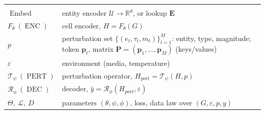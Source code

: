 \begin{table}[t]
\begin{tabular}{@{}l p{}@{}}
\addlinespace
\multicolumn{2}{@{}l}{\emph{Model}}\\
$\operatorname{Embed}$ & entity encoder $\mathcal{U}\to\mathbb{R}^{d}$, or lookup $\mathbf{E}$ \\
$F_\theta\ (\operatorname{ENC})$ & cell encoder, $H=F_\theta(G)$ \\
$p$ & perturbation set $\{(e_t,\tau_t,m_t)\}_{t=1}^{M}$: entity, type, magnitude; token $\mathbf{p}_t$, matrix $\mathbf{P}=(\mathbf{p}_1,\dots,\mathbf{p}_M)$ (keys/values) \\
$\varepsilon$ & environment (media, temperature) \\
$\mathcal{T}_\psi\ (\operatorname{PERT})$ & perturbation operator, $H_{\mathrm{pert}}=\mathcal{T}_\psi(H,p)$ \\
$\mathcal{R}_\phi\ (\operatorname{DEC})$ & decoder, $\hat{y}=\mathcal{R}_\phi(H_{\mathrm{pert}},\varepsilon)$ \\
$\Theta,\ \mathcal{L},\ D$ & parameters $(\theta,\psi,\phi)$, loss, data law over $(G,\varepsilon,p,y)$ \\
\bottomrule
\end{tabular}
\end{table}

